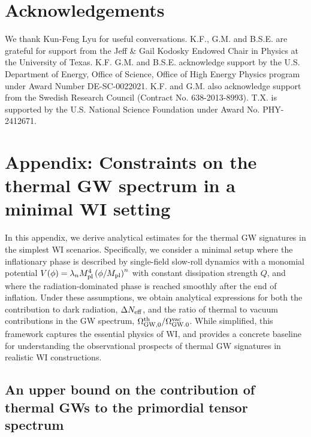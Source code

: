 \section*{Acknowledgements}

We thank Kun-Feng Lyu for useful conversations. K.F., G.M. and B.S.E. are grateful for support from
the Jeff \& Gail Kodosky Endowed Chair in Physics at the University of Texas. K.F. G.M. and B.S.E. acknowledge support
by the U.S. Department of Energy, Office of Science, Office of High Energy Physics program under Award Number DE-SC-0022021. K.F. and G.M. also acknowledge
support from the Swedish Research Council (Contract
No. 638-2013-8993).  T.X. is supported by the U.S. National Science Foundation under Award No. PHY-2412671.


\section{Appendix: Constraints on the thermal GW spectrum in a minimal WI setting}
\label{sec:ch7-appA}
In this appendix, we derive analytical estimates for the thermal GW signatures in the simplest WI scenarios. Specifically, we consider a minimal setup where the inflationary phase is described by single-field slow-roll dynamics with a monomial potential $V(\phi) = \lambda_n M_{\rm pl}^4\left(\phi/M_{\rm pl}\right)^n$ with constant dissipation strength $Q$, and where the radiation-dominated phase is reached smoothly after the end of inflation. Under these assumptions, we obtain analytical expressions for both the contribution to dark radiation, $\Delta N_{\rm eff}$, and the ratio of thermal to vacuum contributions in the GW spectrum, $\Omega_{\rm GW, 0}^{\rm th}/\Omega_{\rm GW. 0}^{\rm vac}$. While simplified, this framework captures the essential physics of WI, and provides a concrete baseline for understanding the observational prospects of thermal GW signatures in realistic WI constructions.

\subsection{An upper bound on the contribution of thermal GWs to the primordial tensor spectrum}\label{sec:ch7-A1}

